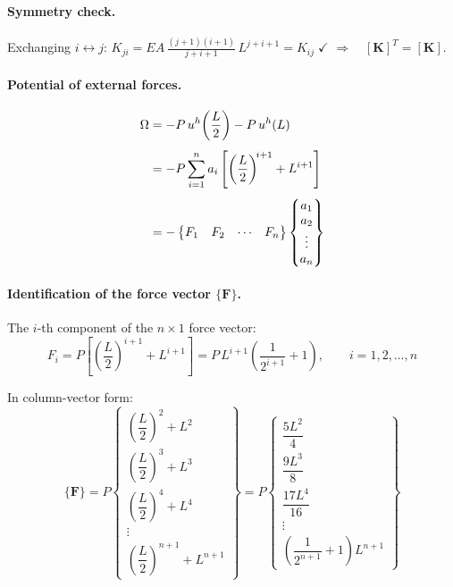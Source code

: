 \documentclass[11pt, a4paper]{article}
\begin{document}
\paragraph{Symmetry check.}  Exchanging $i\leftrightarrow j$:
$K_{ji}=EA\,\frac{(j+1)(i+1)}{j+i+1}\,L^{j+i+1}
=K_{ij}\;\checkmark$
\quad$\Longrightarrow\quad [\mathbf{K}]^T=[\mathbf{K}]$.

\paragraph{Potential of external forces.}
\begin{align}
\Omega &= -P\,u^h\!\left(\frac{L}{2}\right) - P\,u^h(L) \notag\\[4pt]
       &= -P\sum_{i=1}^n a_i
          \left[\left(\frac{L}{2}\right)^{\!i+1}+L^{i+1}\right] \notag\\[4pt]
       &= -\begin{Bmatrix}F_1 & F_2 & \cdots & F_n\end{Bmatrix}
          \begin{Bmatrix}a_1 \\ a_2 \\ \vdots \\ a_n\end{Bmatrix}
\label{eq:Omega_gen}
\end{align}

\paragraph{Identification of the force vector $\{\mathbf{F}\}$.}
The $i$-th component of the $n\times 1$ force vector:
\begin{equation}\label{eq:Fa_gen}
\boxed{F_i
  = P\!\left[\left(\frac{L}{2}\right)^{\!i+1}+L^{i+1}\right]
  = P\,L^{i+1}\!\left(\frac{1}{2^{i+1}}+1\right),
  \qquad i=1,2,\dots,n}
\end{equation}

In column-vector form:
\begin{equation}\label{eq:Fvec_full}
\{\mathbf{F}\} = P
\begin{Bmatrix}
\left(\dfrac{L}{2}\right)^{\!2}+L^2 \\[8pt]
\left(\dfrac{L}{2}\right)^{\!3}+L^3 \\[8pt]
\left(\dfrac{L}{2}\right)^{\!4}+L^4 \\[6pt]
\vdots \\[4pt]
\left(\dfrac{L}{2}\right)^{\!n+1}+L^{n+1}
\end{Bmatrix}
= P
\begin{Bmatrix}
\dfrac{5L^2}{4} \\[8pt]
\dfrac{9L^3}{8} \\[8pt]
\dfrac{17L^4}{16} \\[6pt]
\vdots \\[4pt]
\left(\dfrac{1}{2^{n+1}}+1\right)L^{n+1}
\end{Bmatrix}
\end{equation}
\end{document}
